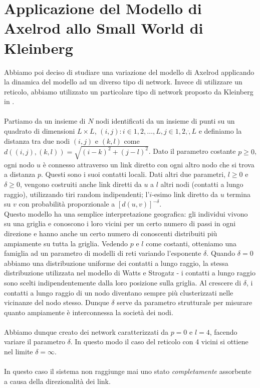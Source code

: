 \documentclass[a4paper,12pt]{article}
\begin{document}
\clearpage

\section{Applicazione del Modello di Axelrod allo Small World di Kleinberg}
Abbiamo poi deciso di studiare una variazione del modello di Axelrod applicando la dinamica del modello ad un diverso tipo di network. Invece di utilizzare un reticolo, abbiamo utilizzato un particolare tipo di network proposto da Kleinberg in \cite{Kleinberg}.
\\ \\Partiamo da un insieme di $N$ nodi identificati da un insieme di punti su un quadrato di dimensioni $L \times L$, ${(i,j) : i \in {1,2,\dots,L}, j \in {1,2,\dot,L}}$ 
e definiamo la distanza tra due nodi $(i,j)$ e $(k,l)$ come $d((i,j),(k,l)) = \sqrt{(i-k)^2+(j-l)^2}$. 
Dato il parametro costante $p \geq 0$, ogni nodo $u$ \`{e} connesso attraverso un link diretto con ogni altro nodo che si trova a distanza $p$. Questi sono i suoi contatti locali.
Dati altri due parametri, $l \geq 0$ e $\delta \geq 0$, vengono costruiti anche link diretti da $u$ a $l$ altri nodi (contatti a lungo raggio), utilizzando tiri random indipendenti;
l'$i$-esimo link diretto da $u$ termina su $v$ con probabilit\`{a} proporzionale a $[d(u,v)]^{-\delta}$.
\\Questo modello ha una semplice interpretazione geografica: gli individui vivono su una griglia e conoscono i loro vicini per
un certo numero di passi in ogni direzione e hanno anche un certo numero di conoscenti distribuiti pi\`{u} ampiamente su tutta la griglia.
Vedendo $p$ e $l$ come costanti, otteniamo una famiglia ad un parametro di modelli di reti variando l'esponente $\delta$.
Quando $\delta = 0$ abbiamo una distribuzione uniforme dei contatti a lungo raggio, la stessa distribuzione utilizzata nel modello
di Watts e Strogatz - i contatti a lungo raggio sono scelti indipendentemente dalla loro posizione sulla griglia.
Al crescere di $\delta$, i contatti a lungo raggio di un nodo diventano sempre pi\`{u} clusterizzati nelle vicinanze del nodo stesso.
Dunque $\delta$ serve da parametro strutturale per misurare quanto ampiamente \`{e} interconnessa la societ\`{a} dei nodi.
\\ \\Abbiamo dunque creato dei network caratterizzati da $p=0$ e $l=4$, facendo variare il parametro $\delta$. In questo modo il caso del reticolo con 4 vicini si ottiene nel limite $\delta = \infty$.
\\ \\In questo caso il sistema non raggiunge mai uno stato \textit{completamente} assorbente a causa della direzionalit\`{a} dei link. 
\end{document}
